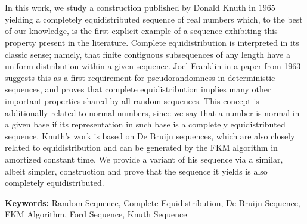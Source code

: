 \chapter*{\runtitle}

\noindent In this work, we study a construction published by Donald Knuth in 1965 yielding a completely equidistributed sequence of real numbers which, to the best of our knowledge, is the first explicit example of a sequence exhibiting this property present in the literature. Complete equidistribution is interpreted in its classic sense; namely, that finite contiguous subsequences of any length have a uniform distribution within a given sequence. Joel Franklin in a paper from 1963 suggests this as a first requirement for pseudorandomness in deterministic sequences, and proves that complete equidistribution implies many other important properties shared by all random sequences. This concept is additionally related to normal numbers, since we say that a number is normal in a given base if its representation in such base is a completely equidistributed sequence. Knuth's work is based on De Bruijn sequences, which are also closely related to equidistribution and can be generated by the FKM algorithm in amortized constant time. We provide a variant of his sequence via a similar, albeit simpler, construction and prove that the sequence it yields is also completely equidistributed.

\bigskip

\noindent\textbf{Keywords:} Random Sequence, Complete Equidistribution, De Bruijn Sequence, FKM Algorithm, Ford Sequence, Knuth Sequence